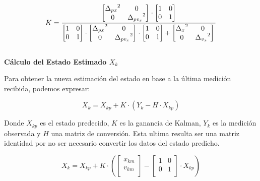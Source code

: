 $$ K =
    \frac{
        \begin{bmatrix}
        {\Delta_{px}}^2 & 0 \\
        0 & {\Delta_{pv_x}}^2 \\
        \end{bmatrix}
        \cdot
        \begin{bmatrix}
        1 & 0 \\
        0 & 1  \\
        \end{bmatrix}
        }
    {
        \begin{bmatrix}
        1 & 0 \\
        0 & 1  \\
        \end{bmatrix}
        \cdot
        \begin{bmatrix}
        {\Delta_{px}}^2 & 0 \\
        0 & {\Delta_{pv_x}}^2 \\
        \end{bmatrix}
        \cdot
        \begin{bmatrix}
        1 & 0 \\
        0 & 1  \\
        \end{bmatrix}
        +
        \begin{bmatrix}
        {\Delta_x}^2 & 0 \\
        0 & {\Delta_{v_x}}^2 \\
        \end{bmatrix} \\ 
    }
$$ \\

\textbf{Cálculo del Estado Estimado $X_k$} \mbox{} \vspace{10pt}

Para obtener la nueva estimación del estado en base a la última medición recibida, podemos expresar:

$$ X_k = X_{kp} + K \cdot ( Y_k - H \cdot X_{kp} ) $$

Donde $X_{kp}$ es el estado predecido, $K$ es la ganancia de Kalman, $Y_k$ es la medición observada y $H$ una matriz de conversión. Esta ultima resulta ser una matriz identidad por no ser necesario convertir los datos del estado predicho.

$$ X_k =
    X_{kp}
    +
    K
    \cdot (
        \begin{bmatrix} x_{km} \\ v_{km} \\ \end{bmatrix}
        -
        \begin{bmatrix}
        1 & 0 \\
        0 & 1  \\
        \end{bmatrix}
        \cdot
        X_{kp}
    )
$$ \\

